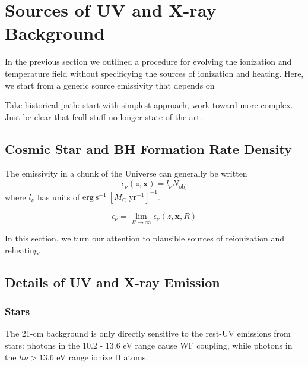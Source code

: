 

\section{Sources of UV and X-ray Background} \label{sec:sources}
In the previous section we outlined a procedure for evolving the ionization and temperature field without specificying the sources of ionization and heating. Here, we start from a generic source emissivity that depends on 

Take historical path: start with simplest approach, work toward more complex. Just be clear that fcoll stuff no longer state-of-the-art.

\subsection{Cosmic Star and BH Formation Rate Density}

The emissivity in a chunk of the Universe can generally be written
\begin{equation}
	\epsilon_{\nu}(z, \mathbf{x}) = l_{\nu} N_{\mathrm{obj}}
\end{equation}
where $l_{\nu}$ has units of $\mathrm{erg} \ \mathrm{s}^{-1} \ [M_{\odot} \ \mathrm{yr}^{-1}]^{-1}$.

\begin{equation}
	\epsilon_{\nu} = \lim_{R\rightarrow \infty} \epsilon_{\nu}(z, \mathbf{x}, R)
\end{equation}

In this section, we turn our attention to plausible sources of reionization and reheating.

\subsection{Details of UV and X-ray Emission}

\subsubsection{Stars}
The 21-cm background is only directly sensitive to the rest-UV emissions from stars: photons in the 10.2 - 13.6 eV range cause WF coupling, while photons in the $h\nu > 13.6$ eV range ionize H atoms.

